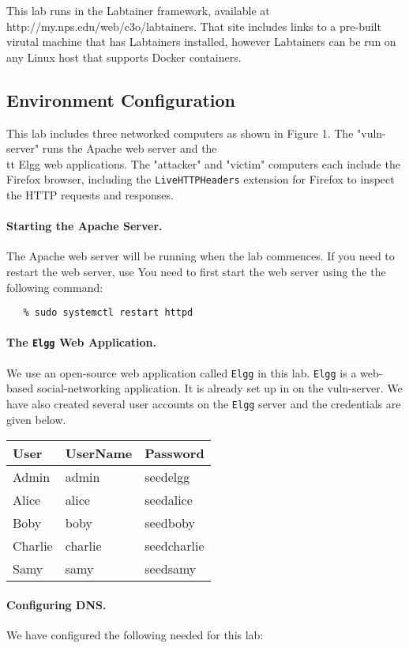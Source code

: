 
This lab runs in the Labtainer framework,
available at http://my.nps.edu/web/c3o/labtainers.
That site includes links to a pre-built virutal machine
that has Labtainers installed, however Labtainers can
be run on any Linux host that supports Docker containers.


\subsection{Environment Configuration}
This lab includes three networked computers as shown in Figure 1.
The "vuln-server" runs the Apache web server and the {\\tt Elgg} web
applications.  The "attacker" and "victim" computers each include
the Firefox browser, including the \texttt{LiveHTTPHeaders} extension for Firefox to
inspect the HTTP requests and responses. 


\paragraph{Starting the Apache Server.}
The Apache web server will be running when the lab
commences.  If you need to restart the web server, use
You need to first start the web server using the
the following command:
\begin{verbatim}
   % sudo systemctl restart httpd
\end{verbatim}

\paragraph{The {\tt Elgg} Web Application.}
We use an open-source web application called {\tt Elgg} in this lab.
{\tt Elgg} is a web-based social-networking application. 
It is already set up in on the vuln-server.
We have also created several user accounts on the {\tt Elgg} server and the credentials are given below.


\vspace{0.1in}
\begin{tabular}{|l|l|l|}
\hline
User 	& UserName 	& Password\\
\hline
Admin 	& admin 	& seedelgg \\
Alice 	& alice 	& seedalice \\
Boby 	& boby 		& seedboby \\
Charlie & charlie 	& seedcharlie \\
Samy 	& samy 		& seedsamy \\
\hline
\end{tabular}
\vspace{0.1in}


\paragraph{Configuring DNS.}
We have configured the following \urlorurls needed for this lab: 
